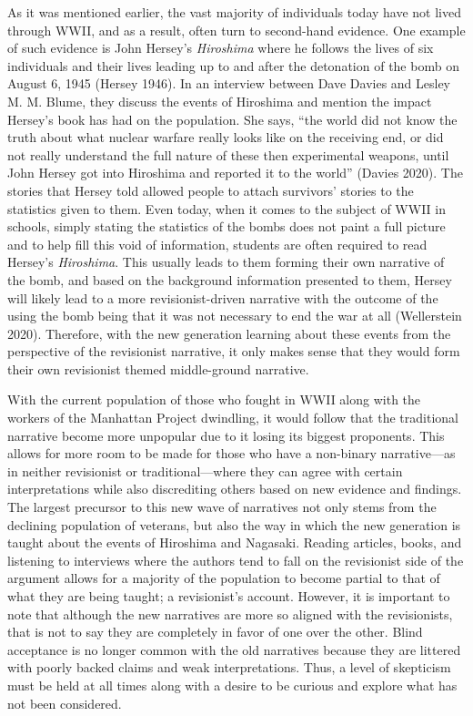 \documentclass[12pt]{turabian-researchpaper}
\begin{document}
As it was mentioned earlier, the vast majority of individuals today have not lived through WWII, and as a result, often turn to second-hand evidence. One example of such evidence is John Hersey’s \textit{Hiroshima} where he follows the lives of six individuals and their lives leading up to and after the detonation of the bomb on August 6, 1945 (Hersey 1946). In an interview between Dave Davies and Lesley M. M. Blume, they discuss the events of Hiroshima and mention the impact Hersey’s book has had on the population. She says, “the world did not know the truth about what nuclear warfare really looks like on the receiving end, or did not really understand the full nature of these then experimental weapons, until John Hersey got into Hiroshima and reported it to the world” (Davies 2020). The stories that Hersey told allowed people to attach survivors’ stories to the statistics given to them. Even today, when it comes to the subject of WWII in schools, simply stating the statistics of the bombs does not paint a full picture and to help fill this void of information, students are often required to read Hersey’s \textit{Hiroshima}. This usually leads to them forming their own narrative of the bomb, and based on the background information presented to them, Hersey will likely lead to a more revisionist-driven narrative with the outcome of the using the bomb being that it was not necessary to end the war at all (Wellerstein 2020). Therefore, with the new generation learning about these events from the perspective of the revisionist narrative, it only makes sense that they would form their own revisionist themed middle-ground narrative.

With the current population of those who fought in WWII along with the workers of the Manhattan Project dwindling, it would follow that the traditional narrative become more unpopular due to it losing its biggest proponents. This allows for more room to be made for those who have a non-binary narrative—as in neither revisionist or traditional—where they can agree with certain interpretations while also discrediting others based on new evidence and findings. The largest precursor to this new wave of narratives not only stems from the declining population of veterans, but also the way in which the new generation is taught about the events of Hiroshima and Nagasaki. Reading articles, books, and listening to interviews where the authors tend to fall on the revisionist side of the argument allows for a majority of the population to become partial to that of what they are being taught; a revisionist’s account. However, it is important to note that although the new narratives are more so aligned with the revisionists, that is not to say they are completely in favor of one over the other. Blind acceptance is no longer common with the old narratives because they are littered with poorly backed claims and weak interpretations. Thus, a level of skepticism must be held at all times along with a desire to be curious and explore what has not been considered.
\end{document}
